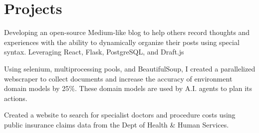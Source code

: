 \documentclass[]{deedy-resume-openfont}
\begin{document}
\begin{minipage}[t]{0.66\textwidth}
\section{Projects}

\begin{tightemize}
\item Developing an open-source Medium-like blog to help others record thoughts and experiences with the ability to dynamically organize their posts using special syntax. Leveraging React, Flask, PostgreSQL, and Draft.js
\end{tightemize}
\sectionsep


\begin{tightemize}
\item Using selenium, multiprocessing pools, and BeautifulSoup, I created a parallelized webscraper to collect documents and increase the accuracy of environment domain models by 25\%. These domain models are used by A.I. agents to plan its actions.
\end{tightemize}
\sectionsep

\begin{tightemize}
\item Created a website to search for specialist doctors and procedure costs using public insurance claims data from the Dept of Health \& Human Services.
\end{tightemize}

\end{minipage}
\end{document}
